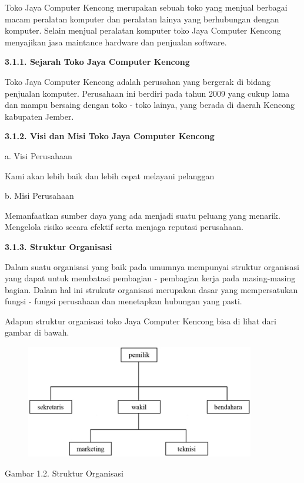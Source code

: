 \documentclass[11pt]{article}
\begin{document}
Toko Jaya Computer Kencong merupakan sebuah toko yang menjual berbagai macam
peralatan komputer  dan peralatan lainya yang berhubungan dengan komputer. Selain
menjual peralatan komputer toko Jaya Computer Kencong menyajikan jasa maintance
hardware dan penjualan software.

\textbf{3.1.1. Sejarah Toko Jaya Computer Kencong}

Toko Jaya Computer Kencong adalah perusahan yang bergerak di bidang penjualan
komputer. Perusahaan ini berdiri pada tahun 2009 yang cukup lama dan mampu
bersaing dengan toko - toko lainya, yang berada di daerah Kencong kabupaten
Jember.

\textbf{3.1.2. Visi dan Misi Toko Jaya Computer Kencong}

a. Visi Perusahaan

Kami akan lebih baik dan lebih cepat melayani pelanggan

b. Misi Perusahaan

Memanfaatkan sumber daya yang ada menjadi suatu peluang yang menarik.
Mengelola risiko secara efektif serta menjaga reputasi perusahaan.

\textbf{3.1.3. Struktur Organisasi}

Dalam suatu organisasi yang baik pada umumnya mempunyai struktur organisasi yang dapat untuk membatasi pembagian - pembagian kerja pada masing-masing bagian. Dalam hal ini strukutr organisasi merupakan dasar yang mempersatukan fungsi - fungsi perusahaan dan menetapkan hubungan yang pasti.

Adapun struktur organisasi toko Jaya Computer Kencong bisa di lihat dari gambar
di bawah.

\begin{figure}[ht!]
  \centering
    \includegraphics[width=10cm]{gambar/struktur}
    \label{struktur}
\end{figure}

\begin{center}
Gambar 1.2. Struktur Organisasi
\end{center}
\end{document}
